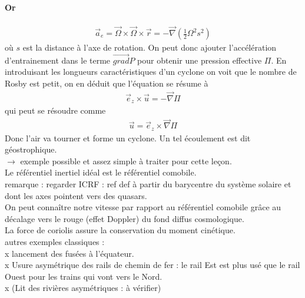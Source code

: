 \documentclass[12pt,prb,aps,epsf]{report}
\begin{document}
\paragraph{Or} \begin{eqnarray}
\vec{a}_e = \vec{\Omega} \times \vec{\Omega} \times \vec{r} = -\vec{\nabla}(\frac{1}{2}\Omega^2s^2)
\end{eqnarray}
où $s$ est la distance à l'axe de rotation. On peut donc ajouter l'accélération d'entrainement dans le terme $\vec{grad}P$ pour obtenir une pression effective $\Pi$. En introduisant les longueurs caractéristiques d'un cyclone on voit que le nombre de Rosby est petit, on en déduit que l'équation se résume à
\begin{eqnarray}
\vec{e}_z \times \vec{u} = -\vec{\nabla}\Pi
\end{eqnarray} 
qui peut se résoudre comme
\begin{eqnarray}
\vec{u} = \vec{e}_z \times \vec{\nabla}\Pi
\end{eqnarray} 
Donc l'air va tourner et forme un cyclone. Un tel écoulement est dit géostrophique.\\
$\rightarrow$ exemple possible et assez simple à traiter pour cette leçon.\\

Le référentiel inertiel idéal est le référentiel comobile.\\ remarque : regarder ICRF : ref def à partir du barycentre du système solaire et dont les axes pointent vers des quasars.\\
On peut connaître notre vitesse par rapport au référentiel comobile grâce au décalage vers le rouge (effet Doppler) du fond diffus cosmologique.\\

La force de coriolis assure la conservation du moment cinétique.\\

 autres exemples classiques :\\ x lancement des fusées à l'équateur.\\ x Usure asymétrique des rails de chemin de fer : le rail Est est plus usé que le rail Ouest pour les trains qui vont vers le Nord.\\ x (Lit des rivières asymétriques : à vérifier) 
 
\end{document}
